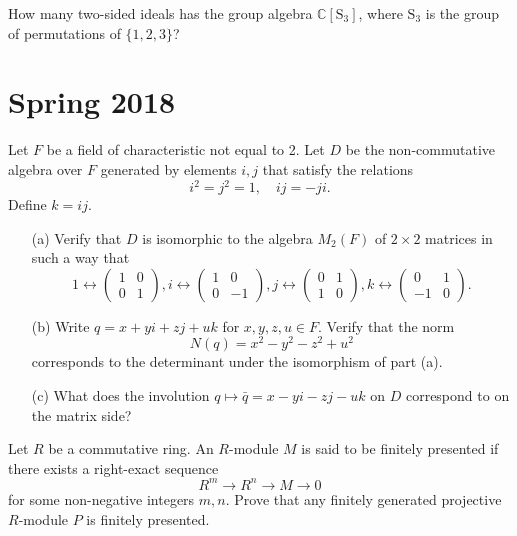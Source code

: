 \documentclass[openany]{book}
\begin{document}
\begin{prob}
    How many two-sided ideals has the group algebra \(\mathbb{C}[\mathrm{S}_{3}]\), where \(\mathrm{S}_{3}\) is the group of permutations of \(\{1,2,3\}\)?
\end{prob}




\chapter{Spring 2018}


\begin{prob}
    Let \(F\) be a field of characteristic not equal to 2. Let \(D\) be the non-commutative algebra over \(F\) generated by elements \(i,j\) that satisfy the relations
    \[i^2 = j^2 = 1, \quad ij = -ji.\]
    Define \(k = ij.\)
    \begin{itemize}
        \item[(a)] Verify that \(D\) is isomorphic to the algebra \(M_2(F)\) of \(2 \times 2\) matrices in such a way that
        \[1 \leftrightarrow \begin{pmatrix} 1 & 0 \\ 0 & 1 \end{pmatrix}, i \leftrightarrow \begin{pmatrix} 1 & 0 \\ 0 & -1 \end{pmatrix}, j \leftrightarrow \begin{pmatrix} 0 & 1 \\ 1 & 0 \end{pmatrix}, k \leftrightarrow \begin{pmatrix} 0 & 1 \\ -1 & 0 \end{pmatrix}.\]
        \item[(b)] Write \(q = x + yi + zj + uk\) for \(x,y,z,u \in F\). Verify that the norm
        \[N(q) = x^2 - y^2 - z^2 + u^2\]
        corresponds to the determinant under the isomorphism of part (a).
        \item[(c)] What does the involution \(q \mapsto \bar{q} = x - yi - zj - uk\) on \(D\) correspond to on the matrix side?
    \end{itemize}
\end{prob}


\begin{prob}
    Let \(R\) be a commutative ring. An \(R\)-module \(M\) is said to be finitely presented if there exists a right-exact sequence
    \[R^m \longrightarrow R^n \longrightarrow M \longrightarrow 0\]
    for some non-negative integers \(m,n\). Prove that any finitely generated projective \(R\)-module \(P\) is finitely presented.
\end{prob}
\end{document}
